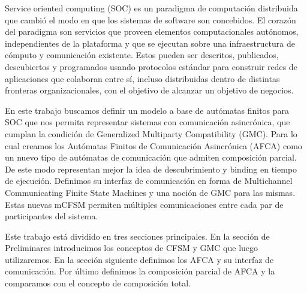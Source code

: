 Service oriented computing (SOC) es un paradigma de computación distribuida que cambió el modo en que los sistemas de software son concebidos. El corazón del paradigma son servicios que proveen elementos computacionales autónomos, independientes de la plataforma y que se ejecutan sobre una infraestructura de cómputo y comunicación existente. Estos pueden ser descritos, publicados, descubiertos y programados usando protocolos estándar para construir redes de aplicaciones que colaboran entre sí, incluso distribuidas dentro de distintas fronteras organizacionales, con el objetivo de alcanzar un objetivo de negocios.

En este trabajo buscamos definir un modelo a base de autómatas finitos para SOC que nos permita representar sistemas con comunicación asincrónica, que cumplan la condición de Generalized Multiparty Compatibility (GMC). Para lo cual creamos los Autómatas Finitos de Comunicación Asincrónica (AFCA) como un nuevo tipo de autómatas de comunicación que admiten composición parcial. De este modo representan mejor la idea de descubrimiento y binding en tiempo de ejecución. Definimos su interfaz de comunicación en forma de Multichannel Communicating Finite State Machines y una noción de GMC para las mismas. Estas nuevas mCFSM permiten múltiples comunicaciones entre cada par de participantes del sistema.
 
Este trabajo está dividido en tres secciones principales. En la sección de Preliminares introducimos los conceptos de CFSM y GMC que luego utilizaremos. En la sección siguiente definimos los AFCA y su interfaz de comunicación. Por último definimos la composición parcial de AFCA y la comparamos con el concepto de composición total.